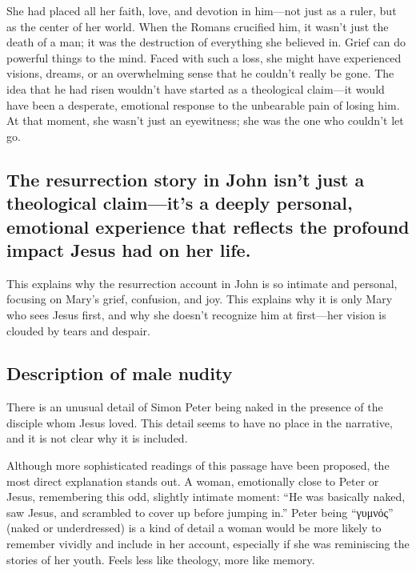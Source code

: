 She had placed all her faith, love, and devotion in him---not just as a ruler, but as the center of her world.
When the Romans crucified him, it wasn't just the death of a man; it was the destruction of everything she believed in.
Grief can do powerful things to the mind.
Faced with such a loss, she might have experienced visions, dreams, or an overwhelming sense that he couldn't really be gone.
The idea that he had risen wouldn't have started as a theological claim---it would have been a desperate, emotional response to the unbearable pain of losing him.
At that moment, she wasn't just an eyewitness; she was the one who couldn't let go.

\subsection{The resurrection story in John isn't just a theological claim---it's a deeply personal, emotional experience that reflects the profound impact Jesus had on her life.}\label{subsec:the-resurrection-story-in-john-isnt-just-a-theological-claimits-a-deeply-personal-emotional-experience-that-reflects-the-profound-impact-jesus-had-on-her-life.}

This explains why the resurrection account in John is so intimate and personal, focusing on Mary's grief, confusion, and joy.
This explains why it is only Mary who sees Jesus first, and why she doesn't recognize him at first---her vision is clouded by tears and despair.

\subsection{Description of male nudity}\label{subsec:description-of-male-nudity}

There is an unusual detail of Simon Peter being naked in the presence of the disciple whom Jesus loved.
This detail seems to have no place in the narrative, and it is not clear why it is included.

Although more sophisticated readings of this passage have been proposed, the most direct explanation stands out.
A woman, emotionally close to Peter or Jesus, remembering this odd, slightly intimate moment: ``He was basically naked, saw Jesus, and scrambled to cover up before jumping in.'' Peter being ``γυμνός'' (naked or underdressed) is a kind of detail a woman would be more likely to remember vividly and include in her account, especially if she was reminiscing the stories of her youth.
Feels less like theology, more like memory.

